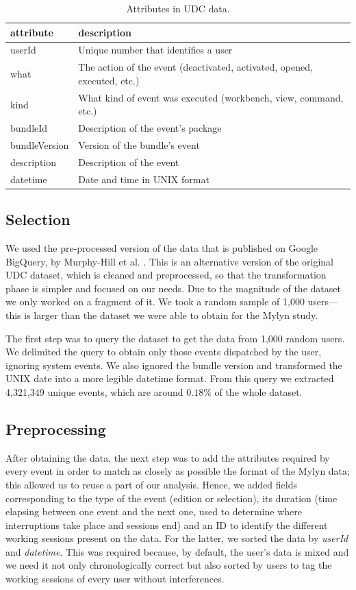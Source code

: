 \documentclass[times]{smrauth}
\begin{document}
\begin{table}[ht!]
	\small
	\renewcommand{\arraystretch}{1.3}
	\caption{Attributes in UDC data. }
	\label{tbl:att_udc}
	\centering
	\begin{tabular}{|p{2.5cm}|p{10cm}|} 
		\hline 
		attribute & description \\  
		\hline 
		\hline 
		userId &  Unique number that identifies a user \\
		what & The action of the event (deactivated, activated, opened, executed, etc.)  \\
		kind & What kind of event was executed (workbench, view, command, etc.)  \\
		bundleId & Description of the event's package  \\
		bundleVersion & Version of the bundle's event  \\
		description & Description of the event\\
		datetime & Date and time in UNIX format\\
		\hline
	\end{tabular}
	
\end{table}

\subsection{Selection}
We used the pre-processed version of the data that is published on Google BigQuery, by Murphy-Hill et al. \cite{SnipesETALASD}. This is an alternative version of the original UDC dataset, which is cleaned and preprocessed, so that the transformation phase is simpler and focused on our needs. Due to the magnitude of the dataset we only worked on a fragment of it. We took a random sample of 1,000 users---this is larger than the dataset we were able to obtain for the Mylyn study.

The first step was to query the dataset to get the data from 1,000 random users. We delimited the query to obtain only those events dispatched by the user, ignoring system events. We also ignored the bundle version and transformed the UNIX date into a more legible datetime format. From this query we extracted 4,321,349 unique events, which are around $0.18\%$ of the whole dataset.

\subsection{Preprocessing}
After obtaining the data, the next step was to add the attributes required by every event in order to match as closely as possible the format of the Mylyn data; this allowed us to reuse a part of our analysis. Hence, we added fields corresponding to the type of the event (edition or selection), its duration (time elapsing between one event and the next one, used to determine where interruptions take place and sessions end) and an ID to identify the different working sessions present on the data. For the latter, we sorted the data by \textit{userId} and \textit{datetime}. This was required because, by default, the user's data is mixed and we need it not only chronologically correct but also sorted by users to tag the working sessions of every user without interferences. 
\end{document}
